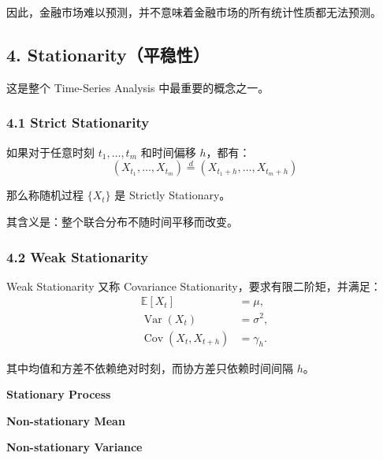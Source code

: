 因此，金融市场难以预测，并不意味着金融市场的所有统计性质都无法预测。

\hypertarget{part-4-52-0001-stationarityux5e73ux7a33ux6027}{%
\subsection{4. Stationarity（平稳性）}\label{part-4-52-0001-stationarityux5e73ux7a33ux6027}}

这是整个 Time-Series Analysis 中最重要的概念之一。

\hypertarget{part-4-52-0001-strict-stationarity}{%
\subsubsection{4.1 Strict Stationarity}\label{part-4-52-0001-strict-stationarity}}

如果对于任意时刻 \(t_1,\ldots,t_m\) 和时间偏移 \(h\)，都有：
\[\boxed{
(X_{t_1},\ldots,X_{t_m})
\overset d=
(X_{t_1+h},\ldots,X_{t_m+h})
}\]

那么称随机过程 \(\{X_t\}\) 是 Strictly Stationary。

其含义是：整个联合分布不随时间平移而改变。

\hypertarget{part-4-52-0001-weak-stationarity}{%
\subsubsection{4.2 Weak Stationarity}\label{part-4-52-0001-weak-stationarity}}

Weak Stationarity 又称 Covariance Stationarity，要求有限二阶矩，并满足：
\[\boxed{
\begin{aligned}
\mathbb E[X_t]&=\mu,\\
\operatorname{Var}(X_t)&=\sigma^2,\\
\operatorname{Cov}(X_t,X_{t+h})&=\gamma_h.
\end{aligned}
}\]

其中均值和方差不依赖绝对时刻，而协方差只依赖时间间隔 \(h\)。

\textbf{Stationary Process}


\textbf{Non-stationary Mean}


\textbf{Non-stationary Variance}


